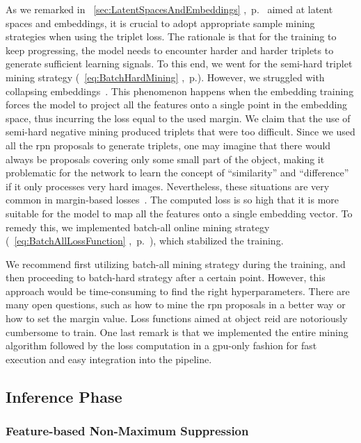 As we remarked in \sectiontext{}~\ref{sec:LatentSpacesAndEmbeddings} ,~p.~\pageref{sec:LatentSpacesAndEmbeddings} aimed at latent spaces and embeddings, it is crucial to adopt appropriate sample mining strategies when using the triplet loss. The rationale is that for the training to keep progressing, the model needs to encounter harder and harder triplets to generate sufficient learning signals. To this end, we went for the semi-hard triplet mining strategy (\eqtext{}~\ref{eq:BatchHardMining} ,~p.\pageref{eq:BatchHardMining}). However, we struggled with collapsing embeddings~\cite{levi2021rethinking}. This phenomenon happens when the embedding training forces the model to project all the features onto a single point in the embedding space, thus incurring the loss equal to the used margin. We claim that the use of semi-hard negative mining produced triplets that were too difficult. Since we used all the \gls{rpn} proposals to generate triplets, one may imagine that there would always be proposals covering only some small part of the object, making it problematic for the network to learn the concept of ``similarity'' and ``difference'' if it only processes very hard images. Nevertheless, these situations are very common in margin-based losses~\cite{levi2021rethinking}. The computed loss is so high that it is more suitable for the model to map all the features onto a single embedding vector. To remedy this, we implemented batch-all online mining strategy (\eqtext{}~\ref{eq:BatchAllLossFunction} ,~p.~\pageref{eq:BatchAllLossFunction}), which stabilized the training.

We recommend first utilizing batch-all mining strategy during the training, and then proceeding to batch-hard strategy after a certain point. However, this approach would be time-consuming to find the right hyperparameters. There are many open questions, such as how to mine the \gls{rpn} proposals in a better way or how to set the margin value. Loss functions aimed at object \gls{reid} are notoriously cumbersome to train. One last remark is that we implemented the entire mining algorithm followed by the loss computation in a \gls{gpu}-only fashion for fast execution and easy integration into the pipeline.

\subsection{Inference Phase}

\subsubsection{Feature-based Non-Maximum Suppression}
\label{sssec:FeatureNonMaximumSuppression}

